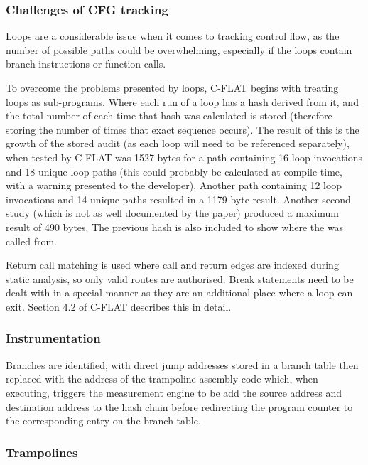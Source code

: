 \subsubsection{Challenges of CFG tracking}

Loops are a considerable issue when it comes to tracking control flow, as the number of possible paths could be overwhelming, especially if the loops contain branch instructions or function calls.

To overcome the problems presented by loops, C-FLAT \cite{Abera2016} begins with treating loops as sub-programs. Where each run of a loop has a hash derived from it, and the total number of each time that hash was calculated is stored (therefore storing the number of times that exact sequence occurs). The result of this is the growth of the stored audit (as each loop will need to be referenced separately), when tested by C-FLAT was 1527 bytes for a path containing 16 loop invocations and 18 unique loop paths (this could probably be calculated at compile time, with a warning presented to the developer). Another path containing 12 loop invocations and 14 unique paths resulted in a 1179 byte result. Another second study (which is not as well documented by the paper) produced a maximum result of 490 bytes. The previous hash is also included to show where the was called from. 

Return call matching is used where call and return edges are indexed during static analysis, so only valid routes are authorised. Break statements need to be dealt with in a special manner as they are an additional place where a loop can exit. Section 4.2 of C-FLAT \cite{Abera2016} describes this in detail.

\subsubsection{Instrumentation}

Branches are identified, with direct jump addresses stored in a branch table then replaced with the address of the trampoline assembly code which, when executing, triggers the measurement engine to be add the source address and destination address to the hash chain before redirecting the program counter to the corresponding entry on the branch table.

\subsubsection{Trampolines}

